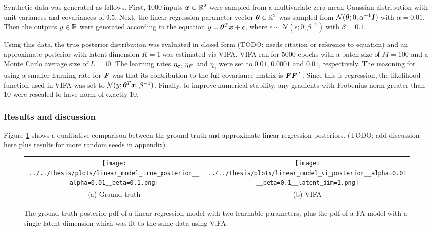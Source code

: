 \documentclass[10pt]{article} %
\newcommand{\vgamma}{\bm{\gamma}}
\begin{document}
Synthetic data was generated as follows. First, $1000$ inputs ${\bm{x}} \in \mathbb{R}^2$ were sampled from a multivariate zero mean Gaussian distribution with unit variances and covariances of $0.5$. Next, the linear regression parameter vector ${\bm{\theta}} \in \mathbb{R}^2$ was sampled from $\mathcal{N} ( {\bm{\theta}} ; 0, \alpha^{-1} {\bm{I}})$ with $\alpha = 0.01$. Then the outputs $y \in \mathbb{R}$ were generated according to the equation $y = {\bm{\theta}}^T {\bm{x}} + \epsilon$, where $\epsilon \sim \mathcal{N} ( \epsilon ; 0, \beta^{-1})$ with $\beta = 0.1$.

Using this data, the true posterior distribution was evaluated in closed form (TODO: needs citation or reference to equation) and an approximate posterior with latent dimension $K=1$ was estimated via VIFA. VIFA ran for $5000$ epochs with a batch size of $M=100$ and a Monte Carlo average size of $L=10$.  The learning rates $\eta_{\bm{c}}$,  $\eta_{\bm{F}}$ and $\eta_{\vgamma}$ were set to $0.01$, $0.0001$ and $0.01$, respectively. The reasoning for using a smaller learning rate for ${\bm{F}}$ was that its contribution to the full covariance matrix is ${\bm{F}}{\bm{F}}^T$. Since this is regression, the likelihood function used in VIFA was set to $\mathcal{N} (y; {\bm{\theta}}^T {\bm{x}}, \beta^{-1})$. Finally, to improve numerical stability, any gradients with Frobenius norm greater than $10$ were rescaled to have norm of exactly $10$.

\subsubsection{Results and discussion}

Figure \ref{fig:linear_regression_synthetic_data_posterior} shows a qualitative comparison between the ground truth and approximate linear regression posteriors. (TODO: add discussion here plus results for more random seeds in appendix).
\begin{figure}[!htbp] 
\begin{center}
\begin{tabular}{cc}
	\texttt{[image: ../../thesis/plots/linear\_model\_true\_posterior\_\_alpha=0.01\_\_beta=0.1.png]}
	& \texttt{[image: ../../thesis/plots/linear\_model\_vi\_posterior\_\_alpha=0.01\_\_beta=0.1\_\_latent\_dim=1.png]} \\
	(a) Ground truth
	& (b) VIFA \\[6pt]
\end{tabular}
\end{center}
\caption{The ground truth posterior pdf of a linear regression model with two learnable parameters, plus the pdf of a FA model with a single latent dimension which was fit to the same data using VIFA.}
\label{fig:linear_regression_synthetic_data_posterior}
\end{figure}
\end{document}
